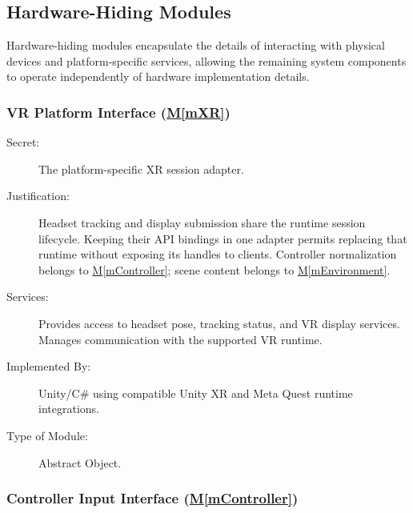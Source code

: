 \documentclass[12pt, titlepage]{article}
\newcommand{\mref}[1]{\hyperref[#1]{M\ref*{#1}}}
\begin{document}
\subsection{Hardware-Hiding Modules}

Hardware-hiding modules encapsulate the details of interacting
with physical devices and platform-specific services, allowing
the remaining system components to operate independently
of hardware implementation details.


\subsubsection{VR Platform Interface (\mref{mXR})}

\begin{description}

\item[Secret:]
The platform-specific XR session adapter.

\item[Justification:]
Headset tracking and display submission share the runtime session lifecycle.
Keeping their API bindings in one adapter permits replacing that runtime
without exposing its handles to clients. Controller normalization belongs
to \mref{mController}; scene content belongs to \mref{mEnvironment}.

\item[Services:]
Provides access to headset pose, tracking status, and VR
display services. Manages communication with the supported
VR runtime.

\item[Implemented By:]
Unity/C\# using compatible Unity XR and Meta Quest runtime
integrations.

\item[Type of Module:]
Abstract Object.

\end{description}


\subsubsection{Controller Input Interface (\mref{mController})}
\end{document}
